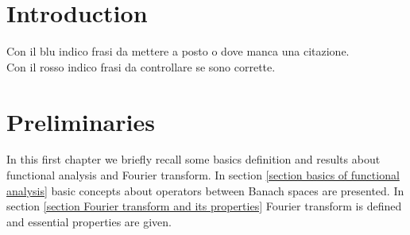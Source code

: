 \documentclass[corpo=11pt, stile=classica, tipotesi=custom,
greek, evenboxes, english]{toptesi}
\numberwithin{equation}{chapter}
\begin{document}
\english
	


\tableofcontents

\ringraziamenti

\sommario

\chapter{Introduction}
{\color{blue} Con il blu indico frasi da mettere a posto o dove manca una citazione.}\\
{\color{red} Con il rosso indico frasi da controllare se sono corrette.}




\chapter{Preliminaries}\label{chapter preliminaries}
In this first chapter we briefly recall some basics definition and results about functional analysis and Fourier transform. In section \ref{section basics of functional analysis} basic concepts about operators between Banach spaces are presented. In section \ref{section Fourier transform and its properties} Fourier transform is defined and essential properties are given.
\end{document}
